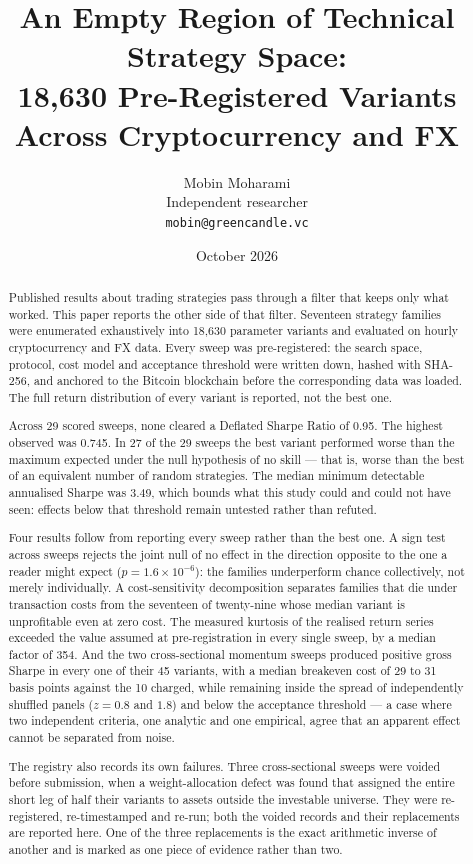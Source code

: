 \documentclass[11pt,a4paper]{article}
\title{An Empty Region of Technical Strategy Space:\\
18{,}630 Pre-Registered Variants Across Cryptocurrency and FX}
\author{Mobin Moharami\\
\small Independent researcher\\
\small \texttt{mobin@greencandle.vc}}
\date{October 2026}
\begin{document}
\maketitle

\begin{abstract}
Published results about trading strategies pass through a filter that keeps
only what worked. This paper reports the other side of that filter. Seventeen
strategy families were enumerated exhaustively into 18{,}630 parameter
variants and evaluated on hourly cryptocurrency and FX data. Every sweep was
pre-registered: the search space, protocol, cost model and acceptance
threshold were written down, hashed with SHA-256, and anchored to the Bitcoin
blockchain before the corresponding data was loaded. The full return
distribution of every variant is reported, not the best one.

Across 29 scored sweeps, none cleared a Deflated Sharpe Ratio of 0.95. The
highest observed was 0.745. In 27 of the 29 sweeps the best variant performed
worse than the maximum expected under the null hypothesis of no skill --- that
is, worse than the best of an equivalent number of random strategies. The
median minimum detectable annualised Sharpe was 3.49, which bounds what this
study could and could not have seen: effects below that threshold remain
untested rather than refuted.

Four results follow from reporting every sweep rather than the best one. A
sign test across sweeps rejects the joint null of no effect in the direction
opposite to the one a reader might expect ($p = 1.6\times10^{-6}$): the
families underperform chance collectively, not merely individually. A
cost-sensitivity decomposition separates families that die under transaction
costs from the seventeen of twenty-nine whose median variant is unprofitable
even at zero cost. The measured kurtosis of the realised return series
exceeded the value assumed at pre-registration in every single sweep, by a
median factor of 354. And the two cross-sectional momentum sweeps produced
positive gross Sharpe in every one of their 45 variants, with a median
breakeven cost of 29 to 31 basis points against the 10 charged, while
remaining inside the spread of independently shuffled panels ($z = 0.8$ and
$1.8$) and below the acceptance threshold --- a case where two independent
criteria, one analytic and one empirical, agree that an apparent effect cannot
be separated from noise.

The registry also records its own failures. Three cross-sectional sweeps were
voided before submission, when a weight-allocation defect
was found that assigned the entire short leg of half their variants to assets
outside the investable universe. They were re-registered, re-timestamped and
re-run; both the voided records and their replacements are reported here. One
of the three replacements is the exact arithmetic inverse of another and is
marked as one piece of evidence rather than two.


\end{abstract}
\end{document}
